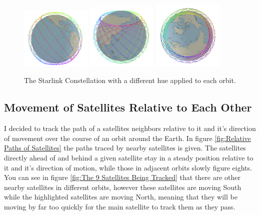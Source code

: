 \documentclass[12pt]{report}
\begin{document}
\begin{figure}
\label{fig:Structure of Network}
\caption{The Starlink Constellation with a different hue applied to each orbit.}
\includegraphics[width=0.3\textwidth]{Hue1}
\includegraphics[width=0.3\textwidth]{Hue2}
\includegraphics[width=0.3\textwidth]{Hue3}
\end{figure}

\subsection{Movement of Satellites Relative to Each Other}

I decided to track the path of a satellites neighbors relative to it and it's direction of movement over the course of an orbit around the Earth. In figure  \ref{fig:Relative Paths of Satellites} the paths traced by nearby satellites is given. The satellites directly ahead of and behind a given satellite stay in a steady position relative to it and it's direction of motion, while those in adjacent orbits slowly figure eights. You can see in figure \ref{fig:The 9 Satellites Being Tracked} that there are other nearby satellites in different orbits, however these satellites are moving South while the highlighted satellites are moving North, meaning that they will be moving by far too quickly for the main satellite to track them as they pass. \cite{OriginalReport}
\end{document}
